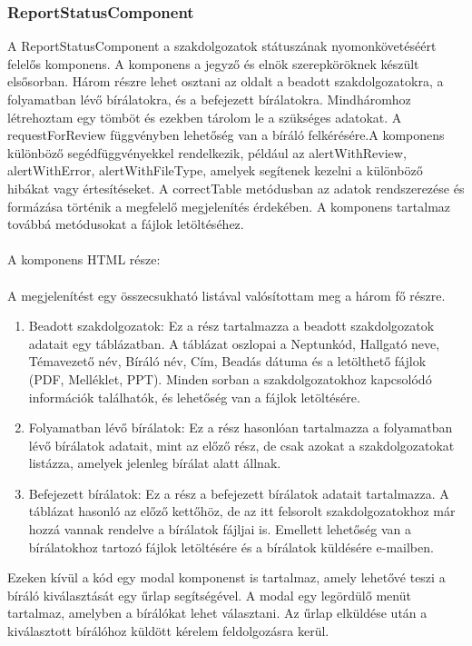 \subsubsection{ReportStatusComponent}

A ReportStatusComponent a szakdolgozatok státuszának nyomonkövetéséért felelős komponens. A komponens a jegyző és elnök szerepköröknek készült elsősorban. Három részre lehet osztani az oldalt a beadott szakdolgozatokra, a folyamatban lévő bírálatokra, és a befejezett bírálatokra. Mindháromhoz létrehoztam egy tömböt és ezekben tárolom le a szükséges adatokat. A requestForReview függvényben lehetőség van a bíráló felkérésére.A komponens különböző segédfüggvényekkel rendelkezik, például az alertWithReview, alertWithError, alertWithFileType, amelyek segítenek kezelni a különböző hibákat vagy értesítéseket. A correctTable metódusban az adatok rendszerezése és formázása történik a megfelelő megjelenítés érdekében. A komponens tartalmaz továbbá metódusokat a fájlok letöltéséhez.\\
\\
A komponens HTML része:\\
\\
A megjelenítést egy összecsukható listával valósítottam meg a három fő részre.
\\
\begin{enumerate}

\item{} Beadott szakdolgozatok: Ez a rész tartalmazza a beadott szakdolgozatok adatait egy táblázatban. A táblázat oszlopai a Neptunkód, Hallgató neve, Témavezető név, Bíráló név, Cím, Beadás dátuma és a letölthető fájlok (PDF, Melléklet, PPT). Minden sorban a szakdolgozatokhoz kapcsolódó információk találhatók, és lehetőség van a fájlok letöltésére.

\item{} Folyamatban lévő bírálatok: Ez a rész hasonlóan tartalmazza a folyamatban lévő bírálatok adatait, mint az előző rész, de csak azokat a szakdolgozatokat listázza, amelyek jelenleg bírálat alatt állnak.

\item{} Befejezett bírálatok: Ez a rész a befejezett bírálatok adatait tartalmazza. A táblázat hasonló az előző kettőhöz, de az itt felsorolt szakdolgozatokhoz már hozzá vannak rendelve a bírálatok fájljai is. Emellett lehetőség van a bírálatokhoz tartozó fájlok letöltésére és a bírálatok küldésére e-mailben.\\
\end{enumerate}
Ezeken kívül a kód egy modal komponenst is tartalmaz, amely lehetővé teszi a bíráló kiválasztását egy űrlap segítségével. A modal egy legördülő menüt tartalmaz, amelyben a bírálókat lehet választani. Az űrlap elküldése után a kiválasztott bírálóhoz küldött kérelem feldolgozásra kerül.

